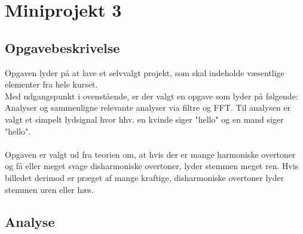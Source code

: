 \chapter{Miniprojekt 3}
\section{Opgavebeskrivelse}
Opgaven lyder på at lave et selvvalgt projekt, som skal indeholde væsentlige elementer fra hele kurset. \\
Med udgangspunkt i ovenstående, er der valgt en opgave som lyder på følgende: \\
Analyser og sammenligne relevante analyser via filtre og FFT.
Til analysen er valgt et simpelt lydsignal hvor hhv. en kvinde siger "hello" og en mand siger "hello".\\ \\
Opgaven er valgt ud fra teorien om, at hvis der er mange harmoniske overtoner og få eller meget svage disharmoniske overtoner, lyder stemmen meget ren. Hvis billedet derimod er præget af mange kraftige, disharmoniske overtoner lyder stemmen uren eller hæs.
\newpage
\section{Analyse}
